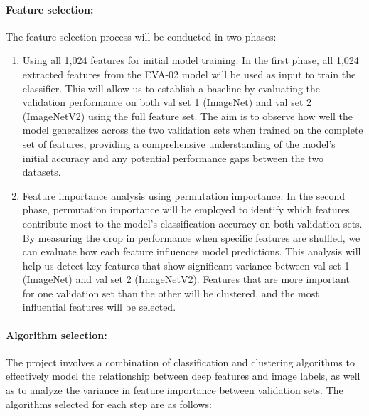 \documentclass[a4paper,11pt]{article}
\begin{document}
\paragraph{Feature selection:}  
The feature selection process will be conducted in two phases:
\begin{enumerate}


    \item Using all 1,024 features for initial model training:
In the first phase, all 1,024 extracted features from the EVA-02 model will be used as input to train the classifier. This will allow us to establish a baseline by evaluating the validation performance on both val set 1 (ImageNet) and val set 2 (ImageNetV2) using the full feature set. The aim is to observe how well the model generalizes across the two validation sets when trained on the complete set of features, providing a comprehensive understanding of the model's initial accuracy and any potential performance gaps between the two datasets.
    \item Feature importance analysis using permutation importance:
In the second phase, permutation importance will be employed to identify which features contribute most to the model's classification accuracy on both validation sets. By measuring the drop in performance when specific features are shuffled, we can evaluate how each feature influences model predictions. This analysis will help us detect key features that show significant variance between val set 1 (ImageNet) and val set 2 (ImageNetV2). Features that are more important for one validation set than the other will be clustered, and the most influential features will be selected.
\end{enumerate}

\paragraph{Algorithm selection:}  
The project involves a combination of classification and clustering algorithms to effectively model the relationship between deep features and image labels, as well as to analyze the variance in feature importance between validation sets. The algorithms selected for each step are as follows:
\end{document}
